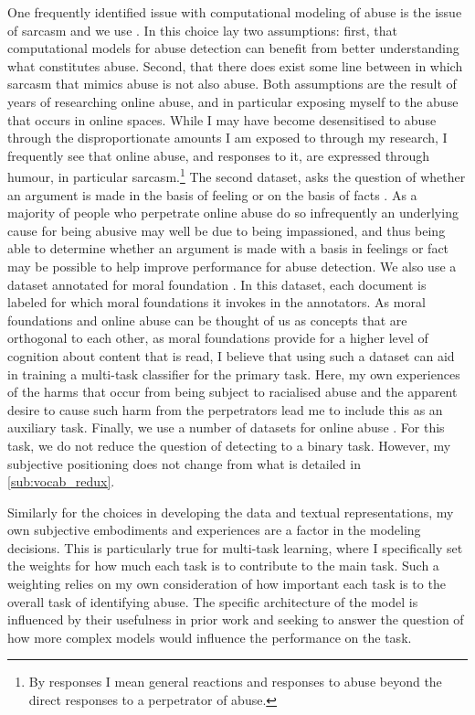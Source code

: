 {One frequently identified issue with computational modeling of abuse is the issue of sarcasm \citep{Rottger:2021} and we use \citet{Oraby:2016}. In this choice lay two assumptions: first, that computational models for abuse detection can benefit from better understanding what constitutes abuse. Second, that there does exist some line between in which sarcasm that mimics abuse is not also abuse. Both assumptions are the result of years of researching online abuse, and in particular exposing myself to the abuse that occurs in online spaces. While I may have become desensitised to abuse through the disproportionate amounts I am exposed to through my research, I frequently see that online abuse, and responses to it, are expressed through humour, in particular sarcasm.\footnote{By responses I mean general reactions and responses to abuse beyond the direct responses to a perpetrator of abuse.}
The second dataset, asks the question of whether an argument is made in the basis of feeling or on the basis of facts \citep{Oraby:2015}. As a majority of people who perpetrate online abuse do so infrequently \citep{Waseem-Hovy:2016} an underlying cause for being abusive may well be due to being impassioned, and thus being able to determine whether an argument is made with a basis in feelings or fact may be possible to help improve performance for abuse detection.
We also use a dataset annotated for moral foundation \citep{Hoover:2019}. In this dataset, each document is labeled for which moral foundations it invokes in the annotators. As moral foundations and online abuse can be thought of us as concepts that are orthogonal to each other, as moral foundations provide for a higher level of cognition about content that is read, I believe that using such a dataset can aid in training a multi-task classifier for the primary task. Here, my own experiences of the harms that occur from being subject to racialised abuse and the apparent desire to cause such harm from the perpetrators lead me to include this as an auxiliary task.
Finally, we use a number of datasets for online abuse \citep{Garcia:2018,Waseem:2016,Waseem-Hovy:2016,Davidson:2017,Wulczyn:2016}. For this task, we do not reduce the question of detecting to a binary task. However, my subjective positioning does not change from what is detailed in \autoref{sub:vocab_redux}.

Similarly for the choices in developing the data and textual representations, my own subjective embodiments and experiences are a factor in the modeling decisions. This is particularly true for multi-task learning, where I specifically set the weights for how much each task is to contribute to the main task. Such a weighting relies on my own consideration of how important each task is to the overall task of identifying abuse. The specific architecture of the model is influenced by their usefulness in prior work \citep{Bingel:2018} and seeking to answer the question of how more complex models would influence the performance on the task.

}

